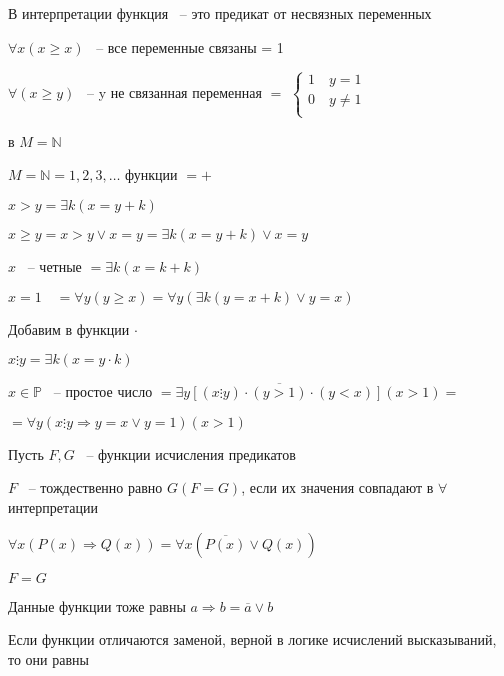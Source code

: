 \documentclass[russian]{lecture-notes}
\begin{document}
    В интерпретации функция ~-- это предикат от несвязных переменных


    $\forall x (x \geq x)$ ~-- все переменные связаны = 1

    $\forall (x \geq y)$ ~-- y не связанная переменная $=$
    $\left \{
    \begin{gathered}
        1 \quad y = 1  \\
        0 \quad y \neq 1 \\
    \end{gathered}
    \right.$

    в $M = \mathbb{N}$


    \begin{example}
        $M = \mathbb{N} = { 1, 2, 3, \dots}$ функции  $= +$

        $x > y = \exists k (x = y + k)$

        $x \geq y = x > y \lor x = y = \exists k (x = y + k)  \lor x = y$

        $x$ ~-- четные $= \exists k (x = k + k)$

        $x = 1 \quad = \forall y (y \geq x) = \forall y (\exists k (y = x + k) \lor y = x)$

        Добавим в функции $\cdot$

        $x \vdots y =  \exists k (x = y \cdot k)$

        $x \in \mathbb{P}$ ~-- простое число $= \overline{\exists y [(x \vdots y) \cdot (y > 1) \cdot (y < x)]} (x > 1) = $

        $= \forall y (x \vdots y \Rightarrow y = x \lor y = 1) (x > 1)$

    \end{example}

    \begin{definition}
        Пусть $F, G$ ~-- функции исчисления предикатов

        $F$ ~-- тождественно равно $G (F = G)$, если их значения совпадают в $\forall$ интерпретации
    \end{definition}

    \begin{example}
        $\forall x (P(x) \Rightarrow Q(x)) = \forall x (\overline{P(x)} \lor Q(x))$

        $F = G$

        Данные функции тоже равны $a \Rightarrow b = \overline{a} \lor b$
    \end{example}

    \begin{remark}
        Если функции отличаются заменой, верной в логике исчислений высказываний, то они равны
    \end{remark}
\end{document}
